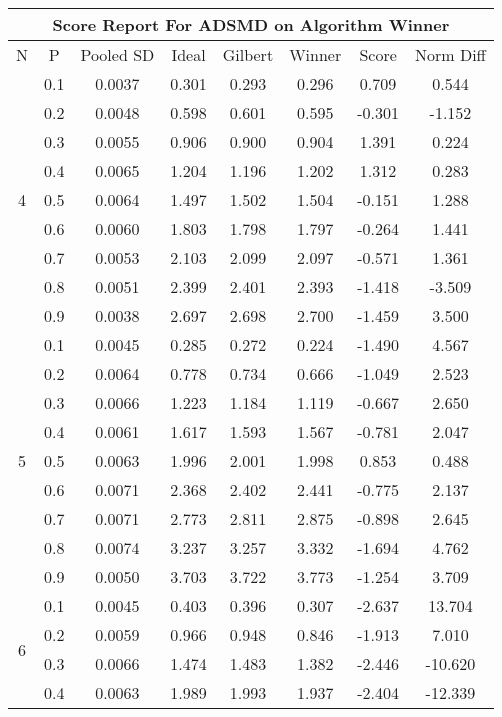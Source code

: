 \documentclass[11pt,a4paper]{report}
\begin{document}
\begin{longtable}{ | c | c || c | c | c | c | c | c | }
\hline
\multicolumn{8}{|c|}{ Score Report For ADSMD on Algorithm Winner} \\
\hline
N & P & Pooled SD &  Ideal &  Gilbert & Winner  & Score & Norm Diff \\
 \hline
 \hline
 \endhead
\multirow{9}{*}{4} & 0.1 & 0.0037 & 0.301 & 0.293 & 0.296 & 0.709 & 0.544 \\
 & 0.2 & 0.0048 & 0.598 & 0.601 & 0.595 & -0.301 & -1.152 \\
 & 0.3 & 0.0055 & 0.906 & 0.900 & 0.904 & 1.391 & 0.224 \\
 & 0.4 & 0.0065 & 1.204 & 1.196 & 1.202 & 1.312 & 0.283 \\
 & 0.5 & 0.0064 & 1.497 & 1.502 & 1.504 & -0.151 & 1.288 \\
 & 0.6 & 0.0060 & 1.803 & 1.798 & 1.797 & -0.264 & 1.441 \\
 & 0.7 & 0.0053 & 2.103 & 2.099 & 2.097 & -0.571 & 1.361 \\
 & 0.8 & 0.0051 & 2.399 & 2.401 & 2.393 & -1.418 & -3.509 \\
 & 0.9 & 0.0038 & 2.697 & 2.698 & 2.700 & -1.459 & 3.500 \\
 \hline
\multirow{9}{*}{5} & 0.1 & 0.0045 & 0.285 & 0.272 & 0.224 & -1.490 & 4.567 \\
 & 0.2 & 0.0064 & 0.778 & 0.734 & 0.666 & -1.049 & 2.523 \\
 & 0.3 & 0.0066 & 1.223 & 1.184 & 1.119 & -0.667 & 2.650 \\
 & 0.4 & 0.0061 & 1.617 & 1.593 & 1.567 & -0.781 & 2.047 \\
 & 0.5 & 0.0063 & 1.996 & 2.001 & 1.998 & 0.853 & 0.488 \\
 & 0.6 & 0.0071 & 2.368 & 2.402 & 2.441 & -0.775 & 2.137 \\
 & 0.7 & 0.0071 & 2.773 & 2.811 & 2.875 & -0.898 & 2.645 \\
 & 0.8 & 0.0074 & 3.237 & 3.257 & 3.332 & -1.694 & 4.762 \\
 & 0.9 & 0.0050 & 3.703 & 3.722 & 3.773 & -1.254 & 3.709 \\
 \hline
\multirow{9}{*}{6} & 0.1 & 0.0045 & 0.403 & 0.396 & 0.307 & -2.637 & 13.704 \\
 & 0.2 & 0.0059 & 0.966 & 0.948 & 0.846 & -1.913 & 7.010 \\
 & 0.3 & 0.0066 & 1.474 & 1.483 & 1.382 & -2.446 & -10.620 \\
 & 0.4 & 0.0063 & 1.989 & 1.993 & 1.937 & -2.404 & -12.339 \\

\end{longtable}
\end{document}
